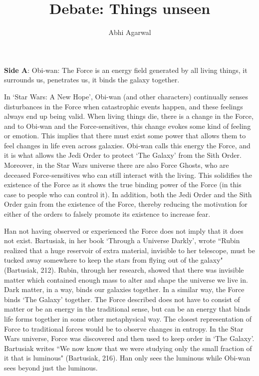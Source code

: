 \documentclass[11pt, oneside]{article}
\title{Debate: Things unseen\vspace{-0.4cm}}
\author{Abhi Agarwal\vspace{-1cm}}
\date{}
\begin{document}
\maketitle

\noindent \textbf{Side A}: Obi-wan: The Force is an energy field generated by all living things, it surrounds us, penetrates us, it binds the galaxy together.

\par In `Star Wars: A New Hope', Obi-wan (and other characters) continually senses disturbances in the Force when catastrophic events happen, and these feelings always end up being valid. When living things die, there is a change in the Force, and to Obi-wan and the Force-sensitives, this change evokes some kind of feeling or emotion. This implies that there must exist some power that allows them to feel changes in life even across galaxies. Obi-wan calls this energy the Force, and it is what allows the Jedi Order to protect `The Galaxy' from the Sith Order. Moreover, in the Star Wars universe there are also Force Ghosts, who are deceased Force-sensitives who can still interact with the living. This solidifies the existence of the Force as it shows the true binding power of the Force (in this case to people who can control it). In addition, both the Jedi Order and the Sith Order gain from the existence of the Force, thereby reducing the motivation for either of the orders to falsely promote its existence to increase fear.

\par Han not having observed or experienced the Force does not imply that it does not exist. Bartusiak, in her book `Through a Universe Darkly', wrote ``Rubin realized that a huge reservoir of extra material, invisible to her telescope, must be tucked away somewhere to keep the stars from flying out of the galaxy" (Bartusiak, 212). Rubin, through her research, showed that there was invisible matter which contained enough mass to alter and shape the universe we live in. Dark matter, in a way, binds our galaxies together. In a similar way, the Force binds `The Galaxy' together. The Force described does not have to consist of matter or be an energy in the traditional sense, but can be an energy that binds life forms together in some other metaphysical way. The closest representation of Force to traditional forces would be to observe changes in entropy. In the Star Wars universe, Force was discovered and then used to keep order in `The Galaxy'. Bartusiak writes ``We now know that we were studying only the small fraction of it that is luminous" (Bartusiak, 216). Han only sees the luminous while Obi-wan sees beyond just the luminous.
\end{document}
